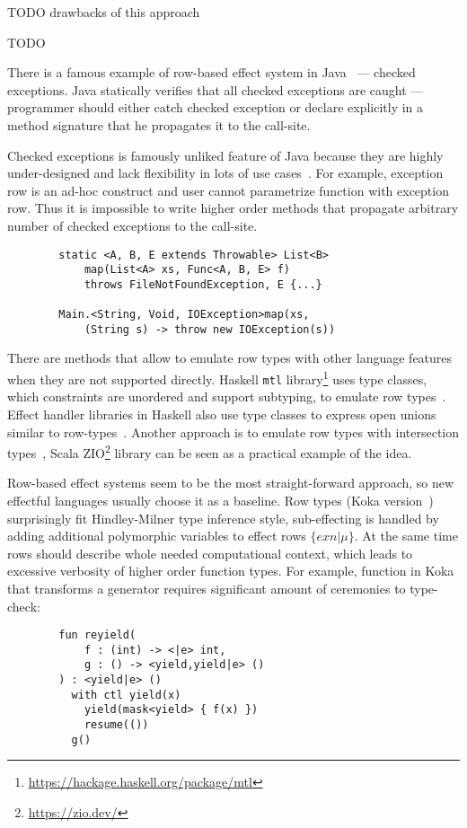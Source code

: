 \documentclass[conference]{IEEEtran}
\begin{document}
    TODO drawbacks of this approach %

    TODO~\cite{hillerstrom2016liberating} %

    There is a famous example of row-based effect system in Java~\cite{gosling2000java} --- checked exceptions.
    Java statically verifies that all checked exceptions are caught --- programmer should either catch checked exception or declare explicitly in a method signature that he propagates it to the call-site.

    Checked exceptions is famously unliked feature of Java because they are highly under-designed and lack flexibility in lots of use cases~\cite{checked-exceptions}.
    For example, exception row is an ad-hoc construct and user cannot parametrize function with exception row.
    Thus it is impossible to write higher order methods that propagate arbitrary number of checked exceptions to the call-site.

    \begin{verbatim}
        static <A, B, E extends Throwable> List<B>
            map(List<A> xs, Func<A, B, E> f)
            throws FileNotFoundException, E {...}

        Main.<String, Void, IOException>map(xs,
            (String s) -> throw new IOException(s))
    \end{verbatim}

    There are methods that allow to emulate row types with other language features when they are not supported directly.
    Haskell \texttt{mtl} library\footnote{\url{https://hackage.haskell.org/package/mtl}} uses type classes, which constraints are unordered and support subtyping, to emulate row types~\cite{jones1995functional}.
    Effect handler libraries in Haskell also use type classes to express open unions similar to row-types~\cite{swierstra2008data}.
    Another approach is to emulate row types with intersection types~\cite{xie2020row}, Scala ZIO\footnote{\url{https://zio.dev/}} library can be seen as a practical example of the idea.


    Row-based effect systems seem to be the most straight-forward approach, so new effectful languages usually choose it as a baseline.
    Row types (Koka version~\cite{leijen2014koka, leijen2017type}) surprisingly fit Hindley-Milner type inference style, sub-effecting is handled by adding additional polymorphic variables to effect rows $\{exn|\mu\}$.
    At the same time rows should describe whole needed computational context, which leads to excessive verbosity of higher order function types.
    For example, function in Koka that transforms a generator requires significant amount of ceremonies to type-check:
    \begin{verbatim}
        fun reyield(
            f : (int) -> <|e> int,
            g : () -> <yield,yield|e> ()
        ) : <yield|e> ()
          with ctl yield(x)
            yield(mask<yield> { f(x) })
            resume(())
          g()
    \end{verbatim}
\end{document}
